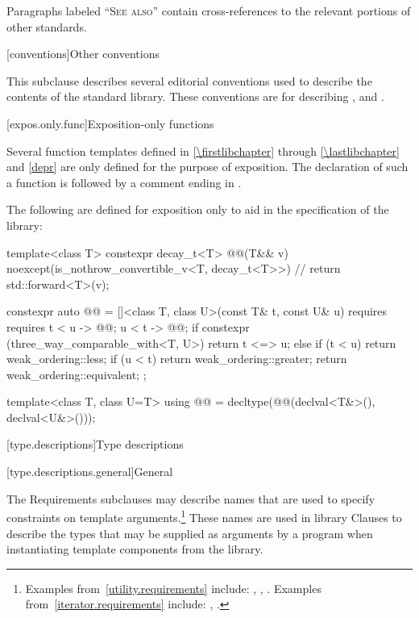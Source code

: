 \pnum
Paragraphs labeled ``\textsc{See also}'' contain cross-references to the relevant portions
of other standards.

[conventions]{Other conventions}
%

\pnum
This subclause describes several editorial conventions used to describe the contents
of the \Cpp{} standard library.
These conventions are for describing
,
and .

[expos.only.func]{Exposition-only functions}

\pnum
Several function templates
defined in \ref{\firstlibchapter} through \ref{\lastlibchapter} and \ref{depr}
are only defined for the purpose of exposition.
The declaration of such a function is followed by a comment ending in \expos.

\pnum
The following are defined for exposition only
to aid in the specification of the library:
%
\begin{codeblock}
template<class T> constexpr decay_t<T> @@(T&& v)
    noexcept(is_nothrow_convertible_v<T, decay_t<T>>)           // \expos
  { return std::forward<T>(v); }

constexpr auto @@ =
  []<class T, class U>(const T& t, const U& u)
    requires requires {
      { t < u } -> @@;
      { u < t } -> @@;
    }
  {
    if constexpr (three_way_comparable_with<T, U>) {
      return t <=> u;
    } else {
      if (t < u) return weak_ordering::less;
      if (u < t) return weak_ordering::greater;
      return weak_ordering::equivalent;
    }
  };

template<class T, class U=T>
using @@ = decltype(@@(declval<T&>(), declval<U&>()));
\end{codeblock}

[type.descriptions]{Type descriptions}

[type.descriptions.general]{General}

\pnum
The Requirements subclauses may describe names that are used to specify
constraints on template arguments.\footnote{Examples
from~\ref{utility.requirements} include:
,
,
.
Examples from~\ref{iterator.requirements} include:
,
.}
These names are used in library Clauses
to describe the types that
may be supplied as arguments by a \Cpp{} program when instantiating template components from
the library.

